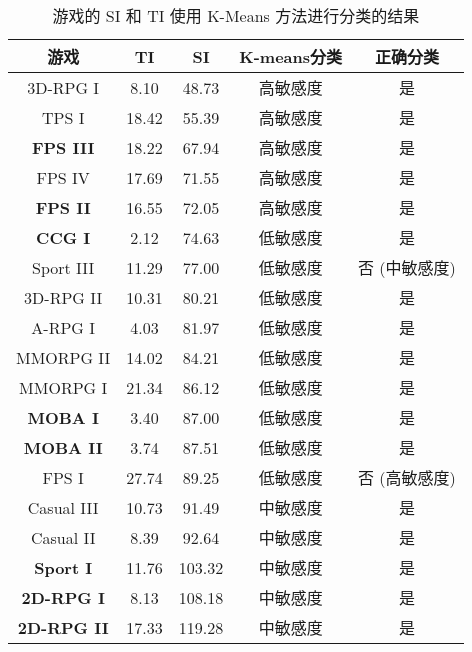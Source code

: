 \begin{table}[!ht]
\centering
\caption{游戏的 SI 和 TI 使用 K-Means 方法进行分类的结果}
\renewcommand\arraystretch{1.25}
\begin{tabular}{@{}ccccc@{}}
\toprule
游戏 & TI & SI & K-means分类 & 正确分类 \\ \midrule
3D-RPG I           & 8.10  & 48.73  & 高敏感度          & 是                    \\
TPS I              & 18.42 & 55.39  & 高敏感度          & 是                    \\
\textbf{FPS III}   & 18.22 & 67.94  & 高敏感度          & 是                    \\
FPS IV             & 17.69 & 71.55  & 高敏感度          & 是                    \\
\textbf{FPS II}    & 16.55 & 72.05  & 高敏感度          & 是                    \\
\textbf{CCG I}     & 2.12  & 74.63  & 低敏感度           & 是                    \\
Sport III          & 11.29 & 77.00  & 低敏感度           & 否 (中敏感度)                   \\
3D-RPG II          & 10.31 & 80.21  & 低敏感度           & 是                    \\
A-RPG I            & 4.03  & 81.97  & 低敏感度           & 是                    \\
MMORPG II          & 14.02 & 84.21  & 低敏感度           & 是                    \\
MMORPG I           & 21.34 & 86.12  & 低敏感度           & 是                    \\
\textbf{MOBA I}    & 3.40  & 87.00  & 低敏感度           & 是                    \\
\textbf{MOBA II}   & 3.74  & 87.51  & 低敏感度           & 是                    \\
FPS I              & 27.74 & 89.25  & 低敏感度           & 否 (高敏感度)
                        \\
Casual III         & 10.73 & 91.49  & 中敏感度          & 是                    \\
Casual II          & 8.39  & 92.64  & 中敏感度          & 是                    \\
\textbf{Sport I}   & 11.76 & 103.32 & 中敏感度          & 是                    \\
\textbf{2D-RPG I}  & 8.13  & 108.18 & 中敏感度          & 是                    \\
\textbf{2D-RPG II} & 17.33 & 119.28 & 中敏感度          & 是                    \\ \bottomrule
\end{tabular}
\label{tab_cat_gor}
\end{table}